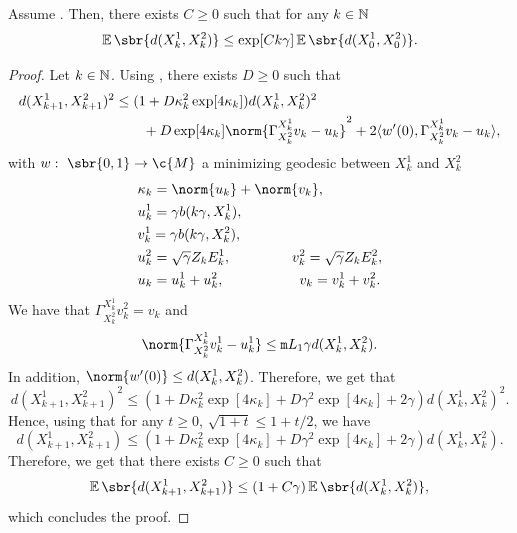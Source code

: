 \begin{proposition}
	\label{prop:explosion}
	Assume .
	Then, there exists $C \geq 0$ such that for any $k \in \mathbb{N}$ \begin{equation} \E\sbr{d(X_k^1, X_k^2)} \leq \exp[C k \gamma] \E\sbr{d(X_0^1, X_0^2)} .
	\end{equation}
\end{proposition}

\begin{proof}
	Let $k \in \mathbb{N}$.
	Using , there exists $D \geq 0$ such that \begin{align} d(X_{k+1}^1, X_{k+1}^2)^2 &\leq (1 +D \kappa_k^2 \exp[4 \kappa_k]) d(X_k^1,X_k^2)^2 \\ & \qquad + D \exp[4 \kappa_k] \norm{\Gamma_{X_{k}^{2}}^{X_k^1} v_k - u_k}^2 + 2 \langle w'(0), \Gamma_{X_{k}^{2}}^{X_k^1} v_k - u_k \rangle , \end{align} with $w: \ \sbr{0,1} \to \c{M}$ a minimizing geodesic between $X_k^1$ and $X_{k}^2$ \begin{align}  & \kappa_k = \norm{u_k} + \norm{v_k} , \\ &u_k^1 = \gamma b(k \gamma, X_k^1) , \\ &v_k^1 = \gamma b(k \gamma, X_{k}^{2}) , \\ &u_k^2 = \sqrt{\gamma} Z_k E_{k}^{1} , \qquad \quad \quad \ v_k^2 = \sqrt{\gamma} Z_k E_k^2 , \\ &u_k = u_k^1 + u_k^2 , \qquad \qquad \quad \ v_k = v_k^1 + v_k^2 .
	\end{align}
	We have that $\Gamma_{X_k^2}^{X_k^1} v_k^2 = v_k$ and \begin{equation} \norm{\Gamma_{X_k^2}^{X_k^1} v_k^1 - u_k^1} \leq \mathtt{m}{L}_1 \gamma d(X_k^1, X_k^2) .
	\end{equation}
	In addition, $\norm{w'(0)} \leq d(X_k^1, X_k^2)$.
	Therefore, we get that \begin{equation} d(X_{k+1}^1, X_{k+1}^2)^2 \leq (1 +D \kappa_k^2 \exp[4 \kappa_k] + D \gamma^2 \exp[4 \kappa_k] +2 \gamma) d(X_k^1,X_k^2)^2 .
	\end{equation}
	Hence, using that for any $t \geq 0$, $\sqrt{1+t} \leq 1 + t/2$, we have \begin{equation} d(X_{k+1}^1, X_{k+1}^2) \leq (1 +D \kappa_k^2 \exp[4 \kappa_k] + D \gamma^2 \exp[4 \kappa_k] +2 \gamma) d(X_k^1,X_k^2) .
	\end{equation}
	Therefore, we get that there exists $C \geq 0$ such that \begin{equation} \E\sbr{d(X_{k+1}^1, X_{k+1}^2)} \leq (1 + C \gamma) \E\sbr{d(X_k^1,X_k^2)} , \end{equation} which concludes the proof.
\end{proof}

